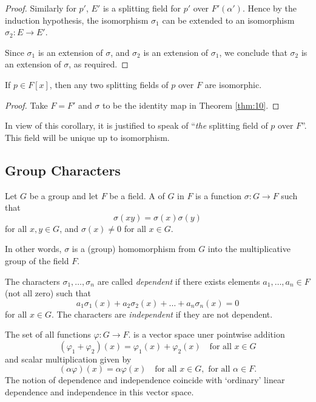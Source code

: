 \begin{theorem}
\begin{proof}
		Similarly for $p'$, $E'$ is a splitting field for $p'$ over $F'(\alpha')$. Hence by the induction hypothesis, the isomorphism $\sigma_1$ can be extended to an isomorphism $\sigma_2 : E \to E'$.
		
		Since $\sigma_1$ is an extension of $\sigma$, and $\sigma_2$ is an extension of $\sigma_1$, we conclude that $\sigma_2$ is an extension of $\sigma$, as required.
	\end{proof}
\end{theorem}

\begin{corollary}
	If $p \in F[x]$, then any two splitting fields of $p$ over $F$ are isomorphic.
	\begin{proof}
		Take $F = F'$ and $\sigma$ to be the identity map in Theorem \ref{thm:10}.
	\end{proof}
\end{corollary}

In view of this corollary, it is justified to speak of ``\emph{the} splitting field of $p$ over $F$''. This field will be unique up to isomorphism.

\subsection{Group Characters}
\begin{definition}
	Let $G$ be a group and let $F$ be a field. A  of $G$ in $F$ is a function $\sigma : G \to F$ such that
	\[
		\sigma(xy) = \sigma(x) \sigma(y)
	\]
	for all $x, y \in G$, and $\sigma(x) \neq 0$ for all $x \in G$.
	
	In other words, $\sigma$ is a (group) homomorphism from $G$ into the multiplicative group of the field $F$.
\end{definition}

\begin{definition}
	The characters $\sigma_1, \dots, \sigma_n$ are called \emph{dependent} if there exists elements $a_1, \dots, a_n \in F$ (not all zero) such that
	\[
		a_1 \sigma_1(x) + a_2 \sigma_2(x) + \dots + a_n \sigma_n(x) = 0
	\]
	for all $x \in G$. The characters are \emph{independent} if they are not dependent.
\end{definition}

\begin{note}
	The set of all functions $\varphi : G \to F$. is a vector space uner pointwise addition
	\[
		(\varphi_1 + \varphi_2)(x) = \varphi_1(x) + \varphi_2(x) \quad \text{for all } x \in G
	\]
	and scalar multiplication given by
	\[
		(\alpha\varphi)(x) = \alpha\varphi(x) \quad \text{for all } x \in G, \text{ for all } \alpha \in F.
	\]
	The notion of dependence and independence coincide with `ordinary' linear dependence and independence in this vector space.
\end{note}

